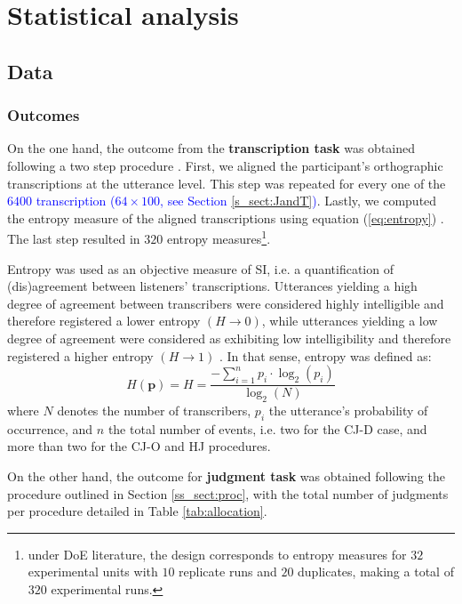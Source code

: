 \section{Statistical analysis}
%
\subsection{Data} \label{s_sect:data}
%
\subsubsection{Outcomes} \label{ss_sect:outcome}
%
On the one hand, the outcome from the \textbf{transcription task} was obtained following a two step procedure \citep{Boonen_et_al_2021}. First, we aligned the participant's orthographic  transcriptions at the utterance level. This step was repeated for every one of the \textcolor{blue}{$6400$ transcription ($64 \times 100$, see Section \ref{s_sect:JandT})}. Lastly, we computed the entropy measure of the aligned transcriptions using equation (\ref{eq:entropy}) \citep{Shannon_1948}. The last step resulted in $320$ entropy measures\footnote{\label{foot:doe}under DoE literature, the design corresponds to entropy measures for $32$ experimental units with $10$ replicate runs and $20$ duplicates, making a total of $320$ experimental runs.}.

Entropy was used as an objective measure of SI, i.e. a quantification of (dis)agreement between listeners' transcriptions. Utterances yielding a high degree of agreement between transcribers were considered highly intelligible and therefore registered a lower entropy $\left( H \rightarrow 0 \right)$, while utterances yielding a low degree of agreement were considered as exhibiting low intelligibility and therefore registered a higher entropy $\left( H \rightarrow 1 \right)$ \citep{Boonen_et_al_2021, Faes_et_al_2021}. In that sense, entropy was defined as: 
%
\begin{equation} \label{eq:entropy}
	H(\pmb{p}) = H = \frac{-\sum_{i=1}^{n} p_{i} \cdot \log_{2}(p_{i})}{\log_{2}(N)}
\end{equation}
%
where $N$ denotes the number of transcribers, $p_{i}$ the utterance's probability of occurrence, and $n$ the total number of events, i.e. two for the CJ-D case, and more than two for the CJ-O and HJ procedures.

On the other hand, the outcome for \textbf{judgment task} was obtained following the procedure outlined in Section \ref{ss_sect:proc}, with the total number of judgments per procedure detailed in Table \ref{tab:allocation}. 

